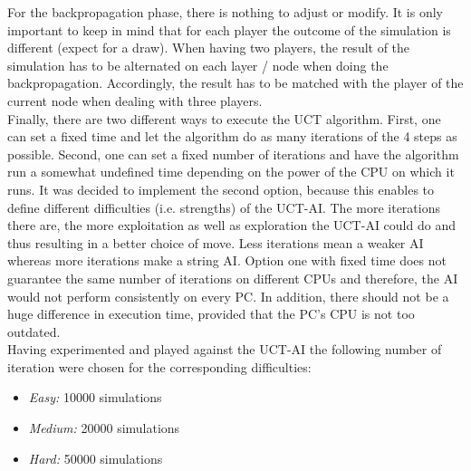 \documentclass[english]{report}
\begin{document}
For the backpropagation phase, there is nothing to adjust or modify. It is only
important to keep in mind that for each player the outcome of the simulation is
different (expect for a draw). When having two players, the result of the
simulation has to be alternated on each layer / node when doing the
backpropagation. Accordingly, the result has to be matched with the player of
the current node when dealing with three players.\\

Finally, there are two different ways to execute the UCT algorithm. First, one
can set a fixed time and let the algorithm do as many iterations of the 4 steps
as possible. Second, one can set a fixed number of iterations and have the
algorithm run a somewhat undefined time depending on the power of the CPU on
which it runs. It was decided to implement the second option, because this
enables to define different difficulties (i.e. strengths) of the UCT-AI.
The more iterations there are, the more exploitation as well as exploration the
UCT-AI could do and thus resulting in a better choice of move. Less iterations
mean a weaker AI whereas more iterations make a string AI. Option one with fixed
time does not guarantee the same number of iterations on different CPUs and
therefore, the AI would not perform consistently on every PC. In addition, there
should not be a huge difference in execution time, provided that the PC's CPU is
not too outdated. \\

Having experimented and played against the UCT-AI the following number of
iteration were chosen for the corresponding difficulties:
\begin{itemize}
	\item \textit{Easy:} 10000 simulations
	\item \textit{Medium:}  20000 simulations
	\item \textit{Hard:}  50000 simulations
\end{itemize}


\end{document}
